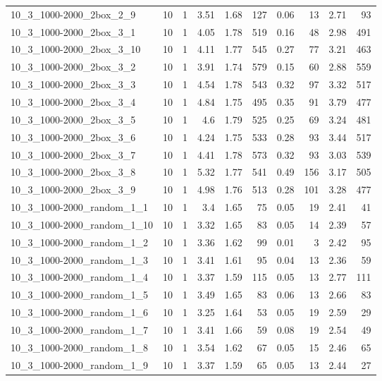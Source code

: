 \begin{center}
\begin{scriptsize}
\begin{longtable}{lrrrrrrrrr}
10\_3\_1000-2000\_2box\_2\_9 & 10 & 1 & 3.51 & 1.68 & 127 & 0.06 & 13 & 2.71 & 93\\
10\_3\_1000-2000\_2box\_3\_1 & 10 & 1 & 4.05 & 1.78 & 519 & 0.16 & 48 & 2.98 & 491\\
10\_3\_1000-2000\_2box\_3\_10 & 10 & 1 & 4.11 & 1.77 & 545 & 0.27 & 77 & 3.21 & 463\\
10\_3\_1000-2000\_2box\_3\_2 & 10 & 1 & 3.91 & 1.74 & 579 & 0.15 & 60 & 2.88 & 559\\
10\_3\_1000-2000\_2box\_3\_3 & 10 & 1 & 4.54 & 1.78 & 543 & 0.32 & 97 & 3.32 & 517\\
10\_3\_1000-2000\_2box\_3\_4 & 10 & 1 & 4.84 & 1.75 & 495 & 0.35 & 91 & 3.79 & 477\\
10\_3\_1000-2000\_2box\_3\_5 & 10 & 1 & 4.6 & 1.79 & 525 & 0.25 & 69 & 3.24 & 481\\
10\_3\_1000-2000\_2box\_3\_6 & 10 & 1 & 4.24 & 1.75 & 533 & 0.28 & 93 & 3.44 & 517\\
10\_3\_1000-2000\_2box\_3\_7 & 10 & 1 & 4.41 & 1.78 & 573 & 0.32 & 93 & 3.03 & 539\\
10\_3\_1000-2000\_2box\_3\_8 & 10 & 1 & 5.32 & 1.77 & 541 & 0.49 & 156 & 3.17 & 505\\
10\_3\_1000-2000\_2box\_3\_9 & 10 & 1 & 4.98 & 1.76 & 513 & 0.28 & 101 & 3.28 & 477\\
10\_3\_1000-2000\_random\_1\_1 & 10 & 1 & 3.4 & 1.65 & 75 & 0.05 & 19 & 2.41 & 41\\
10\_3\_1000-2000\_random\_1\_10 & 10 & 1 & 3.32 & 1.65 & 83 & 0.05 & 14 & 2.39 & 57\\
10\_3\_1000-2000\_random\_1\_2 & 10 & 1 & 3.36 & 1.62 & 99 & 0.01 & 3 & 2.42 & 95\\
10\_3\_1000-2000\_random\_1\_3 & 10 & 1 & 3.41 & 1.61 & 95 & 0.04 & 13 & 2.36 & 59\\
10\_3\_1000-2000\_random\_1\_4 & 10 & 1 & 3.37 & 1.59 & 115 & 0.05 & 13 & 2.77 & 111\\
10\_3\_1000-2000\_random\_1\_5 & 10 & 1 & 3.49 & 1.65 & 83 & 0.06 & 13 & 2.66 & 83\\
10\_3\_1000-2000\_random\_1\_6 & 10 & 1 & 3.25 & 1.64 & 53 & 0.05 & 19 & 2.59 & 29\\
10\_3\_1000-2000\_random\_1\_7 & 10 & 1 & 3.41 & 1.66 & 59 & 0.08 & 19 & 2.54 & 49\\
10\_3\_1000-2000\_random\_1\_8 & 10 & 1 & 3.54 & 1.62 & 67 & 0.05 & 15 & 2.46 & 65\\
10\_3\_1000-2000\_random\_1\_9 & 10 & 1 & 3.37 & 1.59 & 65 & 0.05 & 13 & 2.44 & 27\\

\end{longtable}
\end{scriptsize}
\end{center}
